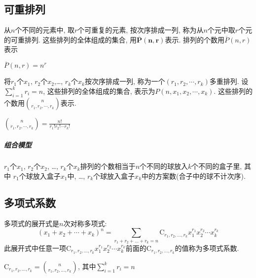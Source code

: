     \subsection{可重排列}

        \begin{definition}[可重排列]
            从$n$个不同的元素中, 取$r$个可重复的元素, 按次序排成一列, 称为从$n$个元中取$r$个元的\textsf{可重排列}. 这些排列的全体组成的集合, 用$\mathbf{\overline{P}(n,r)}$表示.  排列的个数用$\overline{P}(n,r)$表示
        \end{definition}

        \begin{theorem}
            $\overline{P}(n,r)=n^r$
        \end{theorem}

        \begin{definition}[多重排列]
            将$r_1$个$x_1$, $r_2$个$x_2$,\ldots, $r_k$个$x_k$按次序排成一列, 称为一个$(r_1,r_2,\cdots,r_k)$\textsf{多重排列}. 设$\sum_{i=1}^kr_i=n$, 这些排列的全体组成的集合, 表示为$P(n,x_1,x_2,\cdots,x_k)$. 这些排列的个数用$n\choose{r_1,r_2,\cdots,r_k}$表示. 
        \end{definition}

        \begin{theorem}
            ${n\choose{r_1,r_2,\cdots,r_k}}=\frac{n!}{r_1!r_2!\cdots r_k!}$
        \end{theorem}

        \subparagraph{组合模型}

            $r_1$个$x_1$, $r_2$个$x_2$, \ldots, $r_k$个$x_k$排列的个数相当于$n$个不同的球放入$k$个不同的盒子里, 其中 $r_1$个球放入盒子$x_1$中, \ldots, $r_k$个球放入盒子$x_k$中的方案数(合子中的球不计次序). 

    \subsection{多项式系数}

        \begin{definition}[多项式系数]
            多项式的展开式是$n$次对称多项式:
            \[(x_1+x_2+\cdots+x_k)^n=\sum_{r_1+r_2+\ldots+r_k=n}\mathrm{C}_{r_1,r_2,\ldots,r_k}x_1^{r_1}x_2^{r_2}\cdots x_k^{r_k}\]
            此展开式中任意一项$\mathrm{C}_{r_1,r_2,\ldots,r_k}x_1^{r_1}x_2^{r_2}\cdots x_k^{r_k}$前面的$\mathrm{C}_{r_1,r_2,\ldots,r_k}$的值称为\textsf{多项式系数}.
        \end{definition}

        \begin{theorem}\rm
            $\mathrm{C}_{r_1,r_2,\ldots,r_k}={n\choose r_1,r_2,\ldots,r_k}$, 其中$\sum_{i=1}^kr_i=n$
        \end{theorem}

